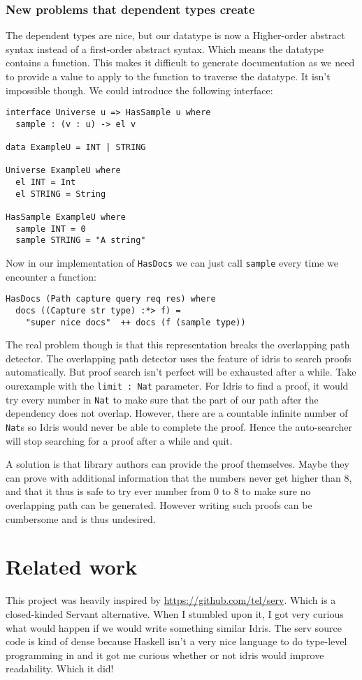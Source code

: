 \documentclass[12pt,a4paper]{article}
\begin{document}
\subsubsection{New problems that dependent types create}
The dependent types are nice, but our datatype is now a Higher-order abstract syntax instead of a first-order abstract syntax.
Which means the datatype contains a function.  This makes it difficult to generate documentation as we need to provide a value
to apply to the function to traverse the datatype. It isn't impossible though. We could introduce the following interface:
\begin{verbatim}
interface Universe u => HasSample u where
  sample : (v : u) -> el v

data ExampleU = INT | STRING

Universe ExampleU where
  el INT = Int
  el STRING = String

HasSample ExampleU where
  sample INT = 0
  sample STRING = "A string"
\end{verbatim}
Now in our implementation of \texttt{HasDocs} we can just call \texttt{sample}
every time we encounter a function:
\begin{verbatim}
HasDocs (Path capture query req res) where
  docs ((Capture str type) :*> f) =
    "super nice docs"  ++ docs (f (sample type))
\end{verbatim}

The real problem though is that this representation breaks the overlapping path detector.
The overlapping path detector uses the feature of idris to search proofs automatically. But
proof search isn't perfect will be exhausted after a while. Take ourexample with the
\texttt{limit : Nat} parameter. For Idris to find a proof, it would try every number
in \texttt{Nat} to  make sure that the part of our path after the dependency does
not overlap. However, there are a countable infinite number of \texttt{Nat}s so
Idris would never be able to complete the proof. Hence the auto-searcher will stop searching
for a proof after a while and quit.

A solution is that library authors can provide the proof themselves. Maybe they can prove with
additional information that the numbers never get higher than $8$, and that it thus is safe
to try ever number from $0$ to $8$ to make sure no overlapping path can be generated. However
writing such proofs can be cumbersome and is thus undesired.
\section{Related work}
This project was heavily inspired by \url{https://github.com/tel/serv}. Which is
a closed-kinded Servant alternative. When I stumbled upon it, I got very curious
what would happen if we would write something similar Idris.  The serv source code is kind of
dense because Haskell isn't a very nice language to do type-level programming in
and it got me curious whether or not idris would improve readability. Which it did!
\end{document}
